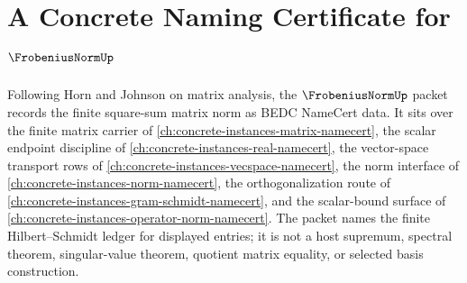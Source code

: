 \chapter{A Concrete Naming Certificate for $\FrobeniusNormUp$}
\label{ch:concrete-instances-frobenius-norm-namecert}

Following Horn and Johnson on matrix analysis, the $\FrobeniusNormUp$ packet records the finite square-sum matrix norm as BEDC NameCert data. It sits over the finite matrix carrier of \autoref{ch:concrete-instances-matrix-namecert}, the scalar endpoint discipline of \autoref{ch:concrete-instances-real-namecert}, the vector-space transport rows of \autoref{ch:concrete-instances-vecspace-namecert}, the norm interface of \autoref{ch:concrete-instances-norm-namecert}, the orthogonalization route of \autoref{ch:concrete-instances-gram-schmidt-namecert}, and the scalar-bound surface of \autoref{ch:concrete-instances-operator-norm-namecert}. The packet names the finite Hilbert--Schmidt ledger for displayed entries; it is not a host supremum, spectral theorem, singular-value theorem, quotient matrix equality, or selected basis construction.

